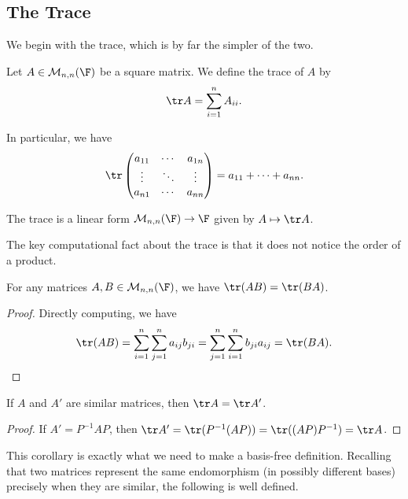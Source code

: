 \subsection{The Trace}

We begin with the trace, which is by far the simpler of the two.

\begin{definition}[Trace]
    Let $A \in \mathcal{M}_{n, n}(\F)$ be a square matrix. We define the trace of $A$ by
    $$
    \tr A = \sum_{i = 1}^n A_{ii}.
    $$
\end{definition}

In particular, we have
$$
\tr \begin{pmatrix}
    a_{11} & \cdots & a_{1n} \\
    \vdots & \ddots & \vdots \\
    a_{n1} & \cdots & a_{nn}
\end{pmatrix} = a_{11} + \cdots + a_{nn}.
$$

\begin{remark}
    The trace is a linear form $\mathcal{M}_{n,n}(\F) \rightarrow \F$ given by $A \mapsto \tr A$.
\end{remark}

The key computational fact about the trace is that it does not notice the order of a product.

\begin{lemma}
    For any matrices $A, B \in \mathcal{M}_{n,n}(\F)$, we have $\tr (AB) = \tr(BA)$.
\end{lemma}
\begin{proof}
    Directly computing, we have
    $$
    \tr (AB) = \sum_{i = 1}^n \sum_{j = 1}^n a_{ij}b_{ji} = \sum_{j = 1}^n \sum_{i = 1}^n b_{ji} a_{ij} = \tr (BA). \qedhere
    $$
\end{proof}

\begin{corollary}
    If $A$ and $A'$ are similar matrices, then $\tr A = \tr A'$.
\end{corollary}
\begin{proof}
    If $A' = P^{-1}AP$, then $\tr A' = \tr(P^{-1}(AP)) = \tr((AP)P^{-1}) = \tr A$.
\end{proof}

This corollary is exactly what we need to make a basis-free definition. Recalling that two matrices represent the same endomorphism (in possibly different bases) precisely when they are similar, the following is well defined.

